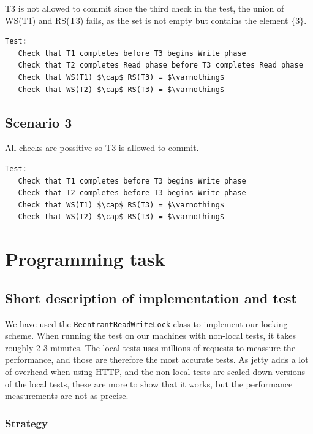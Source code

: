 \documentclass{article}
\theoremstyle{plain}
\theoremstyle{nonumberplain}
\begin{document}
T3 is not allowed to commit since the third check in the test, the union of WS(T1) and RS(T3) fails, as the set is not empty but contains the element $\{3\}$.
\begin{lstlisting}[mathescape]
Test:
   Check that T1 completes before T3 begins Write phase
   Check that T2 completes Read phase before T3 completes Read phase
   Check that WS(T1) $\cap$ RS(T3) = $\varnothing$
   Check that WS(T2) $\cap$ RS(T3) = $\varnothing$
\end{lstlisting}

\subsection{Scenario 3}

All checks are possitive so T3 is allowed to commit. 

\begin{lstlisting}[mathescape]
Test:
   Check that T1 completes before T3 begins Write phase
   Check that T2 completes before T3 begins Write phase
   Check that WS(T1) $\cap$ RS(T3) = $\varnothing$
   Check that WS(T2) $\cap$ RS(T3) = $\varnothing$
\end{lstlisting}

\section{Programming task}

\subsection{Short description of implementation and test}
We have used the \verb|ReentrantReadWriteLock| class to implement our locking scheme. When running the test on our machines with non-local tests, it takes roughly 2-3 minutes. The local tests uses millions of requests to meassure the performance, and those are therefore the most accurate tests. As jetty adds a lot of overhead when using HTTP, and the non-local tests are scaled down versions of the local tests, these are more to show that it works, but the performance measurements are not as precise.

\subsubsection{Strategy}
\end{document}
